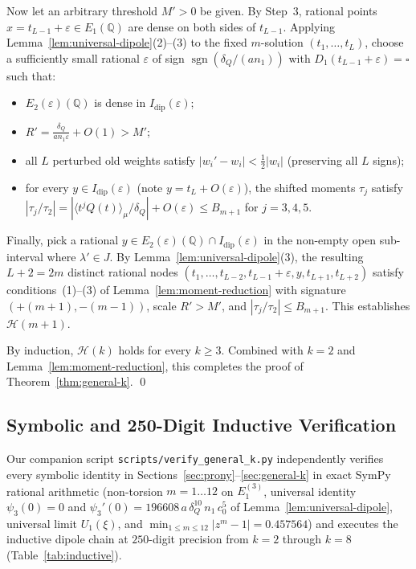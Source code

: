 \documentclass[11pt,a4paper]{article}
\theoremstyle{definition}
\theoremstyle{remark}
\newcommand{\QQ}{\mathbb{Q}}
\begin{document}
Now let an arbitrary threshold $M' > 0$ be given. By Step~3, rational points $x = t_{L-1} + \varepsilon \in E_1(\QQ)$ are dense on both sides of $t_{L-1}$. Applying Lemma~\ref{lem:universal-dipole}(2)--(3) to the fixed $m$-solution $(t_1, \dots, t_L)$, choose a sufficiently small rational $\varepsilon$ of sign $\operatorname{sgn}(\delta_Q / (a n_1))$ with $D_1(t_{L-1} + \varepsilon) = \square$ such that:
\begin{itemize}
\item $E_2(\varepsilon)(\QQ)$ is dense in $I_{\mathrm{dip}}(\varepsilon)$;
\item $R' = \frac{\delta_Q}{a n_1 \varepsilon} + O(1) > M'$;
\item all $L$ perturbed old weights satisfy $|w_i' - w_i| < \frac{1}{2}|w_i|$ (preserving all $L$ signs);
\item for every $y \in I_{\mathrm{dip}}(\varepsilon)$ (note $y = t_L + O(\varepsilon)$), the shifted moments $\tau_j$ satisfy $|\tau_j / \tau_2| = |\langle t^j Q(t) \rangle_\mu / \delta_Q| + O(\varepsilon) \le B_{m+1}$ for $j = 3, 4, 5$.
\end{itemize}
Finally, pick a rational $y \in E_2(\varepsilon)(\QQ) \cap I_{\mathrm{dip}}(\varepsilon)$ in the non-empty open sub-interval where $\lambda' \in J$. By Lemma~\ref{lem:universal-dipole}(3), the resulting $L + 2 = 2m$ distinct rational nodes $(t_1, \dots, t_{L-2}, t_{L-1} + \varepsilon, y, t_{L+1}, t_{L+2})$ satisfy conditions~(1)--(3) of Lemma~\ref{lem:moment-reduction} with signature $(+(m+1), -(m-1))$, scale $R' > M'$, and $|\tau_j / \tau_2| \le B_{m+1}$. This establishes $\mathcal{H}(m + 1)$.

By induction, $\mathcal{H}(k)$ holds for every $k \ge 3$. Combined with $k = 2$ and Lemma~\ref{lem:moment-reduction}, this completes the proof of Theorem~\ref{thm:general-k}. \qed

\subsection{Symbolic and 250-Digit Inductive Verification}

Our companion script \texttt{scripts/verify\_general\_k.py} independently verifies every symbolic identity in Sections~\ref{sec:prony}--\ref{sec:general-k} in exact SymPy rational arithmetic (non-torsion $m = 1 \dots 12$ on $E_1^{(3)}$, universal identity $\psi_3(0) = 0$ and $\psi_3'(0) = 196608 \, a \, \delta_Q^{10} \, n_1 \, c_0^5$ of Lemma~\ref{lem:universal-dipole}, universal limit $U_1(\xi)$, and $\min_{1 \le m \le 12} |z^m - 1| = 0.457564$) and executes the inductive dipole chain at $250$-digit precision from $k = 2$ through $k = 8$ (Table~\ref{tab:inductive}).
\end{document}
